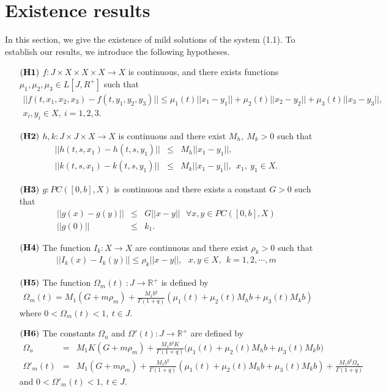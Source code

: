 \documentclass[11pt]{article}
\begin{document}
\section{Existence results}
In this section, we give the existence of mild solutions of the system (1.1).
To establish our results, we introduce the following hypotheses.
\begin{enumerate}
\item[$\bf (H1)$] $f:J \times X \times X \times X \rightarrow X$ is continuous, and there exists functions $\mu_1, \mu_2, \mu_3 \in L[J,R^+]$ such that
\begin{eqnarray*}
||f(t,x_1,x_2,x_3)-f(t,y_1,y_2,y_3)||\leq \mu_1(t)||x_1-y_1||+\mu_2(t)||x_2-y_2||+\mu_3(t)||x_3-y_3||, \\   x_i,y_i\in X, \ i=1,2,3.
\end{eqnarray*}
\item[$\bf (H2)$] $h, k :J \times J \times X \rightarrow X$ is continuous and there exist $M_h, \ M_k >0$ such that
\begin{eqnarray*}
||h(t,s,x_1)-h(t,s,y_1)||& \leq & M_h||x_1-y_1||,\\
||k(t,s,x_1)-k(t,s,y_1)|| &\leq & M_k ||x_1-y_1||, \ \ x_1, \ y_1 \in X.
\end{eqnarray*}
\item[$\bf (H3)$] $g:PC([0,b],X)$ is continuous and there exists a constant $G >0$ such that
\begin{eqnarray*}
 ||g(x)-g(y)|| & \leq &   G||x-y||   \ \ \ \forall x,y \in PC([0,b],X) \\
 ||g(0)|| &\leq &k_1.
\end{eqnarray*}
\item [$\bf (H4)$]The function $I_k :X \rightarrow X$ are continuous and there exist  $\rho_k>0$ such that 
\begin{eqnarray*}
||I_k(x)-I_k(y)||   \leq   \rho_k ||x-y||, \ \ \  x,y \in X, \ \ k=1,2,\cdots, m 
\end{eqnarray*}
\item [$\bf (H5)$] The function $\Omega_m(t) \ : J \rightarrow \mathbb{R}^+$ is defined by
\begin{eqnarray*}
\Omega_m(t)=M_1(G+m\rho_m)+\frac{M_1 b^q}{\Gamma(1+q)}(\mu_1(t)+\mu_2(t)M_hb+\mu_3(t)M_kb)
\end{eqnarray*}
where $0<\Omega_m(t)<1, \ t\in J$.
\item [$\bf (H6)$] The constants $\Omega_u$ and $\Omega'(t) :J \rightarrow \mathbb{R}^+ $ are defined by
\begin{eqnarray*}
\Omega_u & = &M_1K(G+m\rho_m)+\frac{M_1b^q K}{\Gamma(1+q)}\Big(\mu_1(t)+\mu_2(t)M_hb+\mu_3(t)M_kb\Big)\\
\Omega'_m(t) & = & M_1(G+m\rho_m)+\frac{M_1b^q}{\Gamma(1+q)}(\mu_1(t)+\mu_2(t)M_hb+\mu_3(t)M_kb)+\frac{M_1b^q\Omega_u}{\Gamma(1+q)}
\end{eqnarray*}
and $0<\Omega ' _m(t) <1, \ t\in J$.
\end{enumerate}
\end{document}
